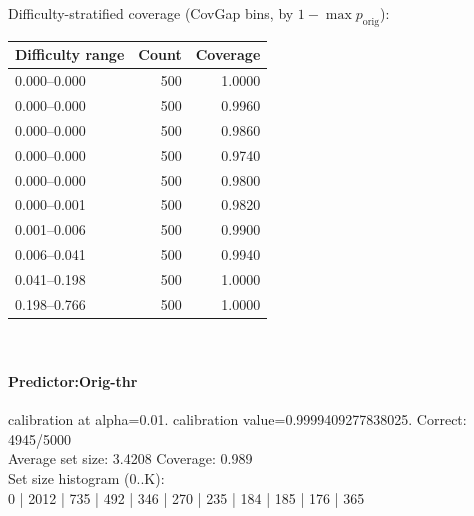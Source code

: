 \documentclass[parskip=half]{scrartcl}
\begin{document}
\textsf{\scriptsize Difficulty-stratified coverage (CovGap bins, by $1-\max p_{\mathrm{orig}}$):}\\
\begin{tabular}{l r r}
\hline
Difficulty range & Count & Coverage \\
\hline
0.000--0.000 & 500 & 1.0000 \\
0.000--0.000 & 500 & 0.9960 \\
0.000--0.000 & 500 & 0.9860 \\
0.000--0.000 & 500 & 0.9740 \\
0.000--0.000 & 500 & 0.9800 \\
0.000--0.001 & 500 & 0.9820 \\
0.001--0.006 & 500 & 0.9900 \\
0.006--0.041 & 500 & 0.9940 \\
0.041--0.198 & 500 & 1.0000 \\
0.198--0.766 & 500 & 1.0000 \\
\hline
\end{tabular}\\[0.5em]
\paragraph{Predictor:Orig-thr} calibration at alpha=0.01. calibration value=0.9999409277838025. Correct: 4945/5000\\
Average set size: 3.4208   Coverage: 0.989\\
Set size histogram (0..K):\\
0 | 2012 | 735 | 492 | 346 | 270 | 235 | 184 | 185 | 176 | 365\\
\end{document}
